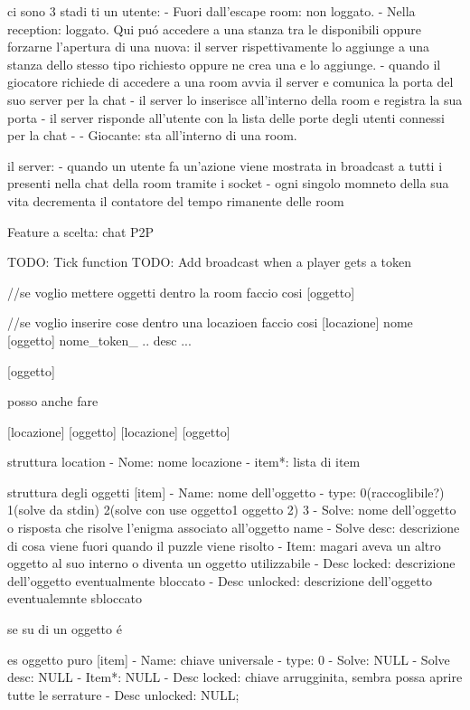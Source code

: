 ci sono 3 stadi ti un utente:
  - Fuori dall'escape room: non loggato.
  - Nella reception: loggato. Qui puó accedere a una stanza tra le disponibili oppure forzarne l'apertura di una nuova: il server rispettivamente 
  lo aggiunge a una stanza dello stesso tipo richiesto oppure ne crea una e lo aggiunge.
      - quando il giocatore richiede di accedere a una room avvia il server e comunica la porta del suo server per la chat
      - il server lo inserisce all'interno della room e registra la sua porta
      - il server risponde all'utente con la lista delle porte degli utenti connessi per la chat 
      - 
  - Giocante: sta all'interno di una room.

il server:
  - quando un utente fa un'azione viene mostrata in broadcast a tutti i presenti nella chat della room tramite
i socket
  - ogni singolo momneto della sua vita decrementa il contatore del tempo rimanente delle room 

Feature a scelta: chat P2P

TODO: Tick function
TODO: Add broadcast when a player gets a token

//se voglio mettere oggetti dentro la room faccio cosi
[oggetto]

//se voglio inserire cose dentro una locazioen faccio cosi
[locazione] nome
  [oggetto]
    nome_token_ .. desc ...
    
  [oggetto]

posso anche fare 

[locazione]
  [oggetto]
  [locazione]
    [oggetto]
    
struttura location
  - Nome: nome locazione
  - item*: lista di item
  


struttura degli oggetti
[item]
  - Name: nome dell'oggetto
  - type: 0(raccoglibile?) 1(solve da stdin) 2(solve con use oggetto1 oggetto 2) 3  
  - Solve: nome dell'oggetto o risposta che risolve l'enigma associato all'oggetto name
  - Solve desc: descrizione di cosa viene fuori quando il puzzle viene risolto
  - Item: magari aveva un altro oggetto al suo interno o diventa un oggetto utilizzabile
  - Desc locked: descrizione dell'oggetto eventualmente bloccato
  - Desc unlocked: descrizione dell'oggetto eventualemnte sbloccato

se su di un oggetto é 

es oggetto puro
[item]
  - Name: chiave universale
  - type: 0
  - Solve: NULL
  - Solve desc: NULL
  - Item*: NULL
  - Desc locked: chiave arrugginita, sembra possa aprire tutte le serrature
  - Desc unlocked: NULL;

